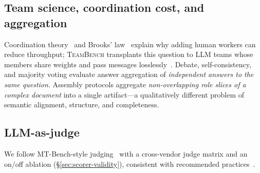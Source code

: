 \documentclass[sigconf,anonymous]{aamas}
\newcommand{\teambench}{\textsc{TeamBench}}
\begin{document}
\subsection{Team science, coordination cost, and aggregation}
Coordination theory~\citep{malone1994interdisciplinary} and Brooks' law~\citep{brooks1995mythical} explain why adding human workers can reduce throughput; \teambench{} transplants this question to LLM teams whose members share weights and pass messages losslessly~\citep{woolley2010evidence}. Debate, self-consistency, and majority voting evaluate answer aggregation of \emph{independent answers to the same question}. Assembly protocols aggregate \emph{non-overlapping role slices of a complex document} into a single artifact---a qualitatively different problem of semantic alignment, structure, and completeness.

\subsection{LLM-as-judge}
We follow MT-Bench-style judging~\citep{zheng2023judging} with a cross-vendor judge matrix and an on/off ablation (\S\ref{sec:scorer-validity}), consistent with recommended practices~\citep{guo2024survey}.
\end{document}
